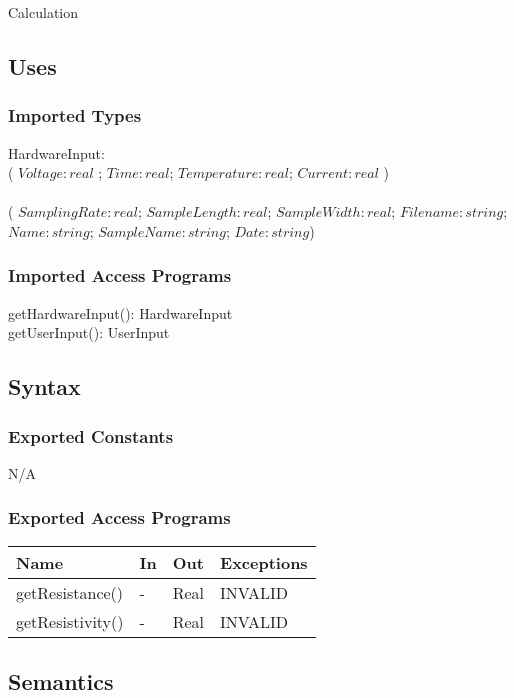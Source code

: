 \documentclass[12pt, titlepage]{article}
\begin{document}
Calculation

\subsection{Uses}

\subsubsection{Imported Types}
HardwareInput: \\
( $Voltage: real $ ; $Time: real$; $Temperature: real$; $Current: real$ )\\

 \\
( $SamplingRate: real$; $SampleLength: real$; $SampleWidth: real$; $Filename: string$; $Name: string$; $SampleName: string$; $Date: string$)

\subsubsection{Imported Access Programs}
getHardwareInput(): HardwareInput \\
getUserInput(): UserInput

\subsection{Syntax}

\subsubsection{Exported Constants}
N/A

\subsubsection{Exported Access Programs}

\begin{center}
\begin{tabular}{p{4cm} p{2cm} p{4cm} p{2cm}}
\hline
\textbf{Name} & \textbf{In} & \textbf{Out} & \textbf{Exceptions} \\
\hline
getResistance() & - & Real & INVALID \\
getResistivity() & - & Real & INVALID \\
\hline
\end{tabular}
\end{center}

\subsection{Semantics}
\end{document}
